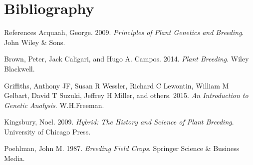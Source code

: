 \documentclass[11pt,ignorenonframetext,aspectratio=169]{beamer}
\newlength{\cslhangindent}
\newenvironment{cslreferences}%
    {\setlength{\parindent}{0pt}%
    \everypar{\setlength{\hangindent}{\cslhangindent}}\ignorespaces}%
    {\par}
\begin{document}
\hypertarget{bibliography}{%
\section{Bibliography}\label{bibliography}}

\begin{frame}{References}
\protect\hypertarget{references}{}
\hypertarget{refs}{}
\begin{cslreferences}
\leavevmode\hypertarget{ref-acquaah2009principles}{}%
Acquaah, George. 2009. \emph{Principles of Plant Genetics and Breeding}.
John Wiley \& Sons.

\leavevmode\hypertarget{ref-brown2014plant}{}%
Brown, Peter, Jack Caligari, and Hugo A. Campos. 2014. \emph{Plant
Breeding}. Wiley Blackwell.

\leavevmode\hypertarget{ref-griffiths2015introduction}{}%
Griffiths, Anthony JF, Susan R Wessler, Richard C Lewontin, William M
Gelbart, David T Suzuki, Jeffrey H Miller, and others. 2015. \emph{An
Introduction to Genetic Analysis}. W.H.Freeman.

\leavevmode\hypertarget{ref-kingsbury2009hybrid}{}%
Kingsbury, Noel. 2009. \emph{Hybrid: The History and Science of Plant
Breeding}. University of Chicago Press.

\leavevmode\hypertarget{ref-poehlman1987breeding}{}%
Poehlman, John M. 1987. \emph{Breeding Field Crops}. Springer Science \&
Business Media.
\end{cslreferences}
\end{frame}
\end{document}
